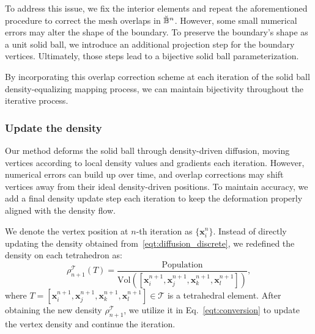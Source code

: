 \documentclass{article}
\begin{document}

To address this issue, we fix the interior elements and repeat the aforementioned procedure to correct the mesh overlaps in $\Breve{\mathbb{B}}^n$. However, some small numerical errors may alter the shape of the boundary. To preserve the boundary's shape as a unit solid ball, we introduce an additional projection step for the boundary vertices. Ultimately, those steps lead to a bijective solid ball parameterization.

By incorporating this overlap correction scheme at each iteration of the solid ball density-equalizing mapping process, we can maintain bijectivity throughout the iterative process.

\subsubsection{Update the density}\label{ssec:redefine_density}
Our method deforms the solid ball through density-driven diffusion, moving vertices according to local density values and gradients each iteration. However, numerical errors can build up over time, and overlap corrections may shift vertices away from their ideal density-driven positions. To maintain accuracy, we add a final density update step each iteration to keep the deformation properly aligned with the density flow.


We denote the vertex position at $n$-th iteration as $\{\mathbf{x}^n_i \}$. Instead of directly updating the density obtained from~\eqref{eqt:diffusion_discrete}, we redefined the density on each tetrahedron as:
\begin{equation}\label{eqt:coupling}
    \rho^{\mathcal{T}}_{n+1}(T) = \frac{\text{Population}}{\text{Vol}\left([\mathbf{x}^{n+1}_i,\mathbf{x}^{n+1}_j,\mathbf{x}^{n+1}_k,\mathbf{x}^{n+1}_l ] \right)},
\end{equation}
where $T = [\mathbf{x}^{n+1}_i,\mathbf{x}^{n+1}_j,\mathbf{x}^{n+1}_k,\mathbf{x}^{n+1}_l ] \in \mathcal{T}$ is a tetrahedral element. After obtaining the new density $\rho^{\mathcal{T}}_{n+1}$, we utilize it in Eq.~\eqref{eqt:conversion} to update the vertex density and continue the iteration.
\end{document}
